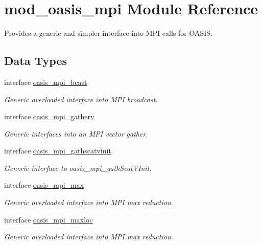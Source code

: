 \hypertarget{namespacemod__oasis__mpi}{}\section{mod\+\_\+oasis\+\_\+mpi Module Reference}
\label{namespacemod__oasis__mpi}


Provides a generic and simpler interface into M\+PI calls for O\+A\+S\+IS.  


\subsection*{Data Types}
\begin{DoxyCompactItemize}
\item 
interface \hyperlink{interfacemod__oasis__mpi_1_1oasis__mpi__bcast}{oasis\+\_\+mpi\+\_\+bcast}
\begin{DoxyCompactList}\small\item\em Generic overloaded interface into M\+PI broadcast. \end{DoxyCompactList}\item 
interface \hyperlink{interfacemod__oasis__mpi_1_1oasis__mpi__gatherv}{oasis\+\_\+mpi\+\_\+gatherv}
\begin{DoxyCompactList}\small\item\em Generic interfaces into an M\+PI vector gather. \end{DoxyCompactList}\item 
interface \hyperlink{interfacemod__oasis__mpi_1_1oasis__mpi__gathscatvinit}{oasis\+\_\+mpi\+\_\+gathscatvinit}
\begin{DoxyCompactList}\small\item\em Generic interface to oasis\+\_\+mpi\+\_\+gath\+Scat\+V\+Init. \end{DoxyCompactList}\item 
interface \hyperlink{interfacemod__oasis__mpi_1_1oasis__mpi__max}{oasis\+\_\+mpi\+\_\+max}
\begin{DoxyCompactList}\small\item\em Generic overloaded interface into M\+PI max reduction. \end{DoxyCompactList}\item 
interface \hyperlink{interfacemod__oasis__mpi_1_1oasis__mpi__maxloc}{oasis\+\_\+mpi\+\_\+maxloc}
\begin{DoxyCompactList}\small\item\em Generic overloaded interface into M\+PI max reduction. \end{DoxyCompactList}\item 

\end{DoxyCompactItemize}
